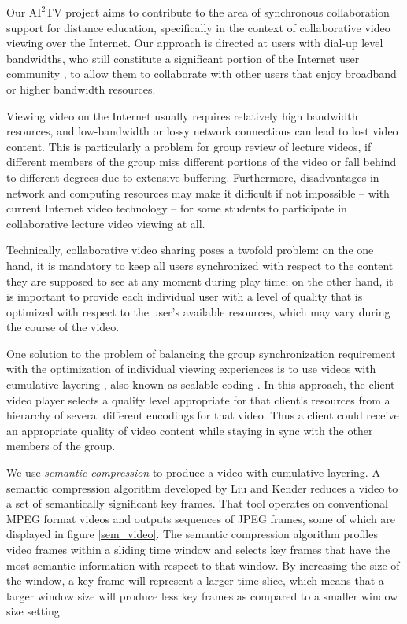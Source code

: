 \documentclass{sig-alternate}
\begin{document}


Our $\mathrm{AI}^2$TV project aims to contribute to the area of
synchronous collaboration support for distance education, specifically
in the context of collaborative video viewing over the Internet.  Our
approach is directed at users with dial-up level bandwidths, who still
constitute a significant portion of the Internet user community
\cite{DIALUP}, to allow them to collaborate with other users that
enjoy broadband or higher bandwidth resources.

Viewing video on the Internet usually requires relatively high
bandwidth resources, and low-bandwidth or lossy network connections
can lead to lost video content.  This is particularly a problem for
group review of lecture videos, if different members of the group miss
different portions of the video or fall behind to different degrees
due to extensive buffering.  Furthermore, disadvantages in network and
computing resources may make it difficult if not impossible -- with
current Internet video technology -- for some students to participate
in collaborative lecture video viewing at all.

Technically, collaborative video sharing poses a twofold problem: on
the one hand, it is mandatory to keep all users synchronized with
respect to the content they are supposed to see at any moment during
play time; on the other hand, it is important to provide each
individual user with a level of quality that is optimized with respect
to the user's available resources, which may vary during the course of
the video.

One solution to the problem of balancing the group synchronization
requirement with the optimization of individual viewing experiences is
to use videos with cumulative layering \cite{mccanne96receiverdriven},
also known as scalable coding \cite{LI}.  In this approach, the client
video player selects a quality level appropriate for that client's
resources from a hierarchy of several different encodings for that
video. Thus a client could receive an appropriate quality of video
content while staying in sync with the other members of the group.



We use {\em semantic compression} to produce a video with cumulative
layering.  A semantic compression algorithm developed by Liu and
Kender \cite{TIECHENG} reduces a video to a set of semantically
significant key frames.  That tool operates on conventional MPEG
format videos and outputs sequences of JPEG frames, some of which are
displayed in figure \ref{sem_video}.  The semantic compression
algorithm profiles video frames within a sliding time window and
selects key frames that have the most semantic information with
respect to that window.  By increasing the size of the window, a key
frame will represent a larger time slice, which means that a larger
window size will produce less key frames as compared to a smaller
window size setting.
\end{document}
